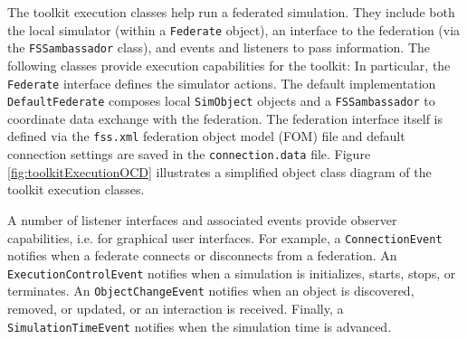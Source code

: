 \documentclass[]{article}
\begin{document}
The toolkit execution classes help run a federated simulation. They include both the local simulator (within a \texttt{Federate} object), an interface to the federation (via the \texttt{FSSambassador} class), and events and listeners to pass information. The following classes provide execution capabilities for the toolkit:
In particular, the \texttt{Federate} interface defines the simulator actions. The default implementation \texttt{DefaultFederate} composes local \texttt{SimObject} objects and a \texttt{FSSambassador} to coordinate data exchange with the federation. The federation interface itself is defined via the \texttt{fss.xml} federation object model (FOM) file and default connection settings are saved in the \texttt{connection.data} file. Figure \ref{fig:toolkitExecutionOCD} illustrates a simplified object class diagram of the toolkit execution classes.

A number of listener interfaces and associated events provide observer capabilities, i.e. for graphical user interfaces. For example, a \texttt{ConnectionEvent} notifies when a federate connects or disconnects from a federation. An \texttt{ExecutionControlEvent} notifies when a simulation is initializes, starts, stops, or terminates. An \texttt{ObjectChangeEvent} notifies when an object is discovered, removed, or updated, or an interaction is received. Finally, a \texttt{SimulationTimeEvent} notifies when the simulation time is advanced.
\end{document}
